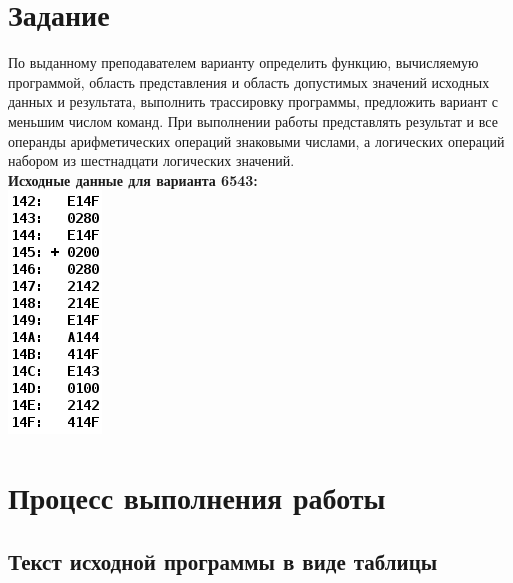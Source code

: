 \documentclass[12pt]{article}
\begin{document}
\section{Задание}
По выданному преподавателем варианту определить функцию, вычисляемую программой, область представления и область допустимых значений исходных данных и результата, выполнить трассировку программы, предложить вариант с меньшим числом команд. При выполнении работы представлять результат и все операнды арифметических операций знаковыми числами, а логических операций набором из шестнадцати логических значений.\\
\textbf{Исходные данные для варианта 6543:}\\
\includegraphics[scale=1]{lab2.png} 
\newpage
\section{Процесс выполнения работы}
\subsection{Текст исходной программы в виде таблицы}
\end{document}
